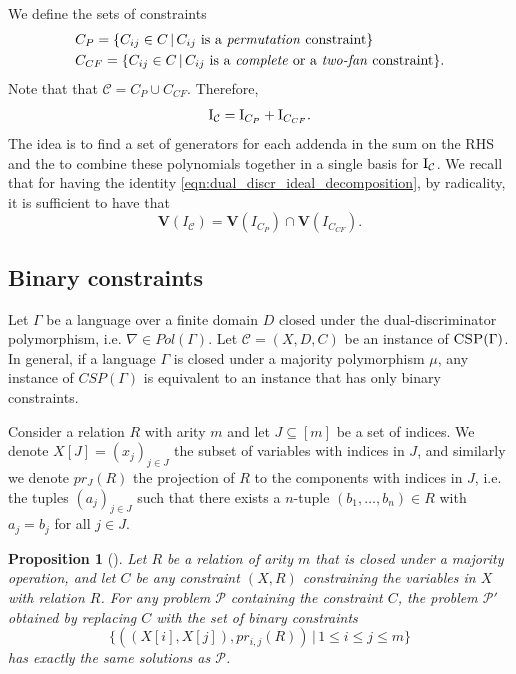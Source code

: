 \documentclass[11pt]{article}
\newcommand{\Cc}{\mathcal{C}}
\newcommand{\CSP}{\textsc{CSP}}
\newcommand{\Variety}[1]{{\textbf{V}}\left( #1 \right)}
\newcommand{\I}{\emph{$\rm{I}$}}
\newcommand{\1}{\textbf{1}}
\newcommand{\GB}{\text{Gr\"{o}bner} }
\newtheorem{proposition}[theorem]{Proposition}
\begin{document}
We define the sets of constraints
\begin{align*}
    &C_{P} = \{ C_{ij} \in C \, | \, C_{ij} \text{ is a \textit{permutation} constraint} \} \\
    &C_{CF} = \{ C_{ij} \in C \, | \, C_{ij} \text{ is a \textit{complete} or a \textit{two-fan} constraint} \}.
\end{align*}
Note that that $\Cc = C_{P} \cup C_{CF}$. Therefore,
\begin{equation}\label{eqn:dual_discr_ideal_decomposition}
    \I_{\Cc} = \I_{C_P} + \I_{C_{CF}}.
\end{equation}
The idea is to find a set of generators for each addenda in the sum on the RHS and the to combine these polynomials together in a single \GB basis for $\I_{\Cc}$. We recall that for having the identity \cref{eqn:dual_discr_ideal_decomposition}, by radicality, it is sufficient to have that
\begin{equation*}
    \Variety{I_{\Cc}} = \Variety{I_{C_P}} \cap \Variety{I_{C_{CF}}}.
\end{equation*}

\subsection{Binary constraints}\label{sect:intro_dual_discriminator}

Let $\Gamma$ be a language over a finite domain $D$ closed under the dual-discriminator polymorphism, i.e. $\nabla \in Pol(\Gamma)$. Let $\Cc = (X, D, C)$ be an instance of $\CSP(\Gamma)$. In general, if a language $\Gamma$ is closed under a majority polymorphism $\mu$, any instance of $CSP(\Gamma)$ is equivalent to an instance that has only binary constraints. 

Consider a relation $R$ with arity $m$ and let $J \subseteq [m]$ be a set of indices. We denote $X[J] = (x_j)_{j \in J}$ the subset of variables with indices in $J$, and similarly we denote $pr_J(R)$ the projection of $R$ to the components with indices in $J$, i.e. the tuples $(a_j)_{j \in J}$ such that there exists a $n$-tuple $(b_1, \ldots, b_n) \in R$ with $a_j = b_j$ for all $j \in J$.

\begin{proposition}[\cite{Jeavons:1997:CPC}]\label{prop:majority_to_binary_majority}
    Let $R$ be a relation of arity $m$ that is closed under a majority operation, and let $C$ be any constraint $(X,R)$ constraining the variables in $X$ with relation $R$.
    For any problem $\mathcal{P}$ containing the constraint $C$, the problem $\mathcal{P}'$ obtained by replacing $C$ with the set of binary constraints
    \begin{equation*}
        \{((X[i],X[j]), pr_{i,j}(R)) \, | \, 1 \leq i \leq j \leq m \}
    \end{equation*}
    has exactly the same solutions as $\mathcal{P}$.
\end{proposition}
\end{document}
